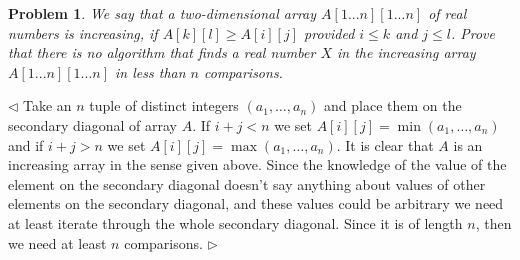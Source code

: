 \documentclass[12pt]{article}
\newtheorem{problem}{Problem}[subsection]
\newenvironment{solution}{\par $\triangleleft$}{$\triangleright$}
\begin{document}
\begin{problem} We say that a two-dimensional array $A[1...n][1...n]$ of real numbers is increasing, if $A[k][l]\geq A[i][j]$ provided $i\leq k$ and $j\leq l$. Prove that there is no algorithm that finds a real number $X$ in the increasing array $A[1...n][1...n]$ in less than $n$ comparisons. 
\end{problem}
\begin{solution} Take an $n$ tuple of distinct integers $(a_1,\ldots,a_n)$ and place them on the secondary diagonal of array $A$. If $i+j<n$ we set $A[i][j]=\min(a_1,\ldots,a_n)$ and if $i+j>n$ we set $A[i][j]=\max(a_1,\ldots,a_n)$. It is clear that $A$ is an increasing array in the sense given above. Since the knowledge of the value of the element on the secondary diagonal doesn't say anything about values of other elements on the secondary diagonal, and these values could be arbitrary we need at least iterate through the whole secondary diagonal. Since it is of length $n$, then we need at least $n$ comparisons.
\end{solution}
 
\end{document}
